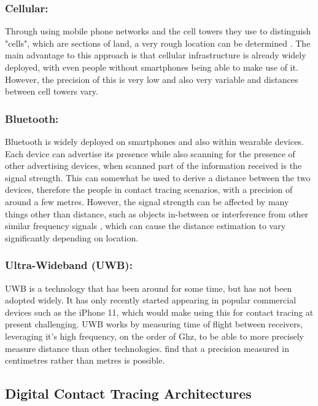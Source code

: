 \documentclass{l4proj}
\begin{document}
\subsubsection{Cellular:}

Through using mobile phone networks and the cell towers they use to distinguish "cells", which are sections of land, a very rough location can be determined \citep{hernandez-orallo_evaluating_2020}. The main advantage to this approach is that cellular infrastructure is already widely deployed, with even people without smartphones being able to make use of it. However, the precision of this is very low and also very variable and distances between cell towers vary.

\subsubsection{Bluetooth:}

Bluetooth is widely deployed on smartphones and also within wearable devices. Each device can advertise its presence while also scanning for the presence of other advertising devices, when scanned part of the information received is the signal strength. This can somewhat be used to derive a distance between the two devices, therefore the people in contact tracing scenarios, with a precision of around a few metres. However, the signal strength can be affected by many things other than distance, such as objects in-between or interference from other similar frequency signals \citep{ahmed_survey_2020}, which can cause the distance estimation to vary significantly depending on location.

\subsubsection{Ultra-Wideband (UWB):}

UWB is a technology that has been around for some time, but has not been adopted widely. It has only recently started appearing in popular commercial devices such as the iPhone 11, which would make using this for contact tracing at present challenging. UWB works by measuring time of flight between receivers, leveraging it's high frequency, on the order of Ghz, to be able to more precisely measure distance than other technologies. \citet{angelis_experimental_2008} find that a precision measured in centimetres rather than metres is possible.

\subsection{Digital Contact Tracing Architectures}
\end{document}
